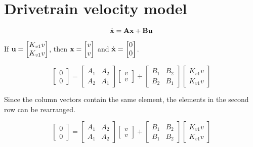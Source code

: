 \section{Drivetrain velocity model}

\begin{equation*}
  \dot{\mathbf{x}} = \mathbf{A}\mathbf{x} + \mathbf{B}\mathbf{u}
\end{equation*}

If $\mathbf{u} =
\begin{bmatrix}
  K_{v1} v \\
  K_{v1} v
\end{bmatrix}$, then $\mathbf{x} =
\begin{bmatrix}
  v \\
  v
\end{bmatrix}$ and $\dot{\mathbf{x}} =
\begin{bmatrix}
  0 \\
  0
\end{bmatrix}$.

\begin{equation*}
  \begin{bmatrix}
    0 \\
    0
  \end{bmatrix} =
  \begin{bmatrix}
    A_1 & A_2 \\
    A_2 & A_1
  \end{bmatrix}
  \begin{bmatrix}
    v \\
    v
  \end{bmatrix} +
  \begin{bmatrix}
    B_1 & B_2 \\
    B_2 & B_1
  \end{bmatrix}
  \begin{bmatrix}
    K_{v1} v \\
    K_{v1} v
  \end{bmatrix}
\end{equation*}

Since the column vectors contain the same element, the elements in the second
row can be rearranged.

\begin{equation*}
  \begin{bmatrix}
    0 \\
    0
  \end{bmatrix} =
  \begin{bmatrix}
    A_1 & A_2 \\
    A_1 & A_2
  \end{bmatrix}
  \begin{bmatrix}
    v \\
    v
  \end{bmatrix} +
  \begin{bmatrix}
    B_1 & B_2 \\
    B_1 & B_2
  \end{bmatrix}
  \begin{bmatrix}
    K_{v1} v \\
    K_{v1} v
  \end{bmatrix}
\end{equation*}

